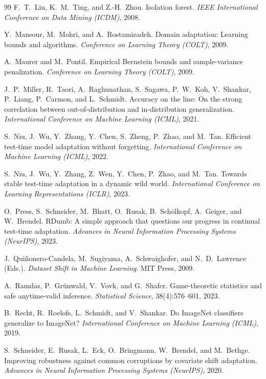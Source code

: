 \begin{thebibliography}{99}
F.~T.~Liu, K.~M.~Ting, and Z.-H.~Zhou.
Isolation forest.
\textit{IEEE International Conference on Data Mining (ICDM)}, 2008.

Y.~Mansour, M.~Mohri, and A.~Rostamizadeh.
Domain adaptation: Learning bounds and algorithms.
\textit{Conference on Learning Theory (COLT)}, 2009.

A.~Maurer and M.~Pontil.
Empirical Bernstein bounds and sample-variance penalization.
\textit{Conference on Learning Theory (COLT)}, 2009.

J.~P.~Miller, R.~Taori, A.~Raghunathan, S.~Sagawa, P.~W.~Koh, V.~Shankar,
P.~Liang, P.~Carmon, and L.~Schmidt.
Accuracy on the line: On the strong correlation between out-of-distribution and
in-distribution generalization.
\textit{International Conference on Machine Learning (ICML)}, 2021.

S.~Niu, J.~Wu, Y.~Zhang, Y.~Chen, S.~Zheng, P.~Zhao, and M.~Tan.
Efficient test-time model adaptation without forgetting.
\textit{International Conference on Machine Learning (ICML)}, 2022.

S.~Niu, J.~Wu, Y.~Zhang, Z.~Wen, Y.~Chen, P.~Zhao, and M.~Tan.
Towards stable test-time adaptation in a dynamic wild world.
\textit{International Conference on Learning Representations (ICLR)}, 2023.

O.~Press, S.~Schneider, M.~Bhatt, O.~Rusak, B.~Sch\"olkopf, A.~Geiger,
and W.~Brendel.
RDumb: A simple approach that questions our progress in continual test-time
adaptation.
\textit{Advances in Neural Information Processing Systems (NeurIPS)}, 2023.

J.~Qui\~nonero-Candela, M.~Sugiyama, A.~Schwaighofer, and N.~D.~Lawrence
(Eds.).
\textit{Dataset Shift in Machine Learning}.
MIT Press, 2009.

A.~Ramdas, P.~Gr\"unwald, V.~Vovk, and G.~Shafer.
Game-theoretic statistics and safe anytime-valid inference.
\textit{Statistical Science}, 38(4):576--601, 2023.

B.~Recht, R.~Roelofs, L.~Schmidt, and V.~Shankar.
Do ImageNet classifiers generalize to ImageNet?
\textit{International Conference on Machine Learning (ICML)}, 2019.

S.~Schneider, E.~Rusak, L.~Eck, O.~Bringmann, W.~Brendel, and
M.~Bethge.
Improving robustness against common corruptions by covariate shift
adaptation.
\textit{Advances in Neural Information Processing Systems (NeurIPS)}, 2020.


\end{thebibliography}
